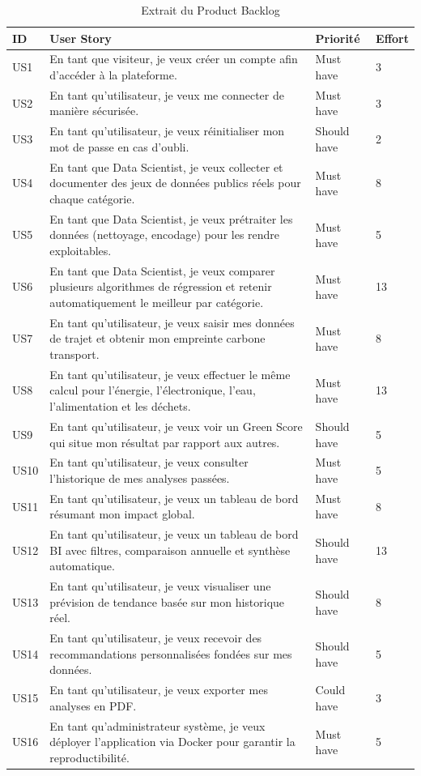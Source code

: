 \begin{table}[H]
\centering
\caption{Extrait du Product Backlog}
\label{tab:backlog}
\begin{tabular}{|p{0.7cm}|p{7.6cm}|p{1.9cm}|p{1.3cm}|}
\hline
\rowcolor{isiBlue!15}
\textbf{ID} & \textbf{User Story} & \textbf{Priorité} & \textbf{Effort} \\
\hline
US1  & En tant que visiteur, je veux créer un compte afin d'accéder à la plateforme. & Must have & 3 \\ \hline
US2  & En tant qu'utilisateur, je veux me connecter de manière sécurisée. & Must have & 3 \\ \hline
US3  & En tant qu'utilisateur, je veux réinitialiser mon mot de passe en cas d'oubli. & Should have & 2 \\ \hline
US4  & En tant que Data Scientist, je veux collecter et documenter des jeux de données publics réels pour chaque catégorie. & Must have & 8 \\ \hline
US5  & En tant que Data Scientist, je veux prétraiter les données (nettoyage, encodage) pour les rendre exploitables. & Must have & 5 \\ \hline
US6  & En tant que Data Scientist, je veux comparer plusieurs algorithmes de régression et retenir automatiquement le meilleur par catégorie. & Must have & 13 \\ \hline
US7  & En tant qu'utilisateur, je veux saisir mes données de trajet et obtenir mon empreinte carbone transport. & Must have & 8 \\ \hline
US8  & En tant qu'utilisateur, je veux effectuer le même calcul pour l'énergie, l'électronique, l'eau, l'alimentation et les déchets. & Must have & 13 \\ \hline
US9  & En tant qu'utilisateur, je veux voir un Green Score qui situe mon résultat par rapport aux autres. & Should have & 5 \\ \hline
US10 & En tant qu'utilisateur, je veux consulter l'historique de mes analyses passées. & Must have & 5 \\ \hline
US11 & En tant qu'utilisateur, je veux un tableau de bord résumant mon impact global. & Must have & 8 \\ \hline
US12 & En tant qu'utilisateur, je veux un tableau de bord BI avec filtres, comparaison annuelle et synthèse automatique. & Should have & 13 \\ \hline
US13 & En tant qu'utilisateur, je veux visualiser une prévision de tendance basée sur mon historique réel. & Should have & 8 \\ \hline
US14 & En tant qu'utilisateur, je veux recevoir des recommandations personnalisées fondées sur mes données. & Should have & 5 \\ \hline
US15 & En tant qu'utilisateur, je veux exporter mes analyses en PDF. & Could have & 3 \\ \hline
US16 & En tant qu'administrateur système, je veux déployer l'application via Docker pour garantir la reproductibilité. & Must have & 5 \\ \hline
\end{tabular}
\end{table}

